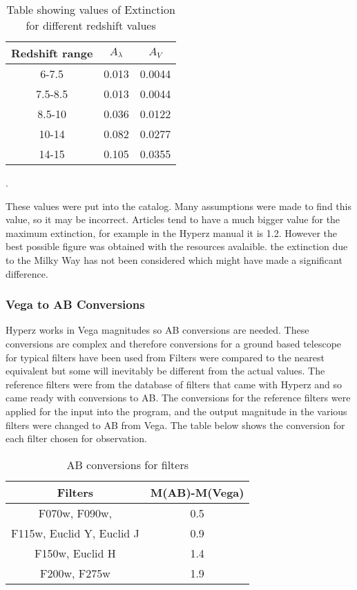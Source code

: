 \begin{table}[ht]
				\begin{center}
					\begin{tabular}{c|c|c}
						Redshift range & $A_\lambda$ & $A_V$  \\
						\hline \hline
						6-7.5	   &0.013&  0.0044 \\
						7.5-8.5&0.013&  0.0044 \\
						8.5-10 &0.036&  0.0122\\
						10-14  &0.082&  0.0277\\
						14-15  &0.105&  0.0355\\
					\end{tabular}
				\end{center}
				\caption{Table showing values of Extinction for different redshift values}
				\label{tab:extinction_values}
			\end{table}.

These values were put into the catalog. Many assumptions were made to find this value, so it may be incorrect. Articles tend to have a much bigger value for the maximum extinction, for example in the Hyperz manual it is 1.2. However the best possible figure was obtained with the resources avalaible. the extinction due to the Milky Way has not been considered which might have made a significant difference.

	          \subsubsection{Vega to AB Conversions}
		Hyperz works in Vega magnitudes so AB conversions are needed. These conversions are complex and therefore conversions for a ground based telescope for typical filters have been used from \cite[576]{Graham} Filters were compared to the nearest equivalent but some will inevitably be different from the actual values. The reference filters were from the database of filters that came with Hyperz and so came ready with conversions to AB. The conversions for the reference filters were applied for the input into the program, and the output magnitude in the various filters were changed to AB from Vega. The table below shows the conversion for each filter chosen for observation.
			\begin{table}[ht]
				\begin{center}
					\begin{tabular}{c|c}
						Filters & M(AB)-M(Vega) \\
						\hline \hline
						F070w, F090w,  & 0.5 \\
						F115w, Euclid Y, Euclid J	& 0.9\\
						 F150w, Euclid H	& 1.4\\
						F200w, F275w & 1.9\\
					\end{tabular}
				\end{center}
				\caption{AB conversions for filters}
				\label{tab:AB_conversion}
			\end{table}

